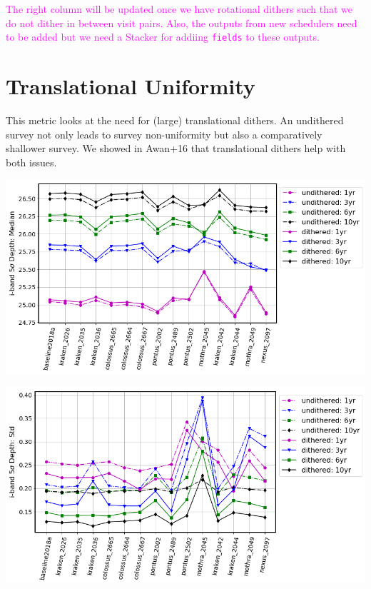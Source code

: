 \documentclass[a4paper,10pt]{article}
\newcommand{\ttt}[1]{\texttt{#1}}
\newcommand{\cl}[1]{\textcolor{magenta}{#1}}
\begin{document}
\cl{The right column will be updated once we have rotational dithers such that we do not dither in between visit pairs. Also, the outputs from new schedulers need to be added but we need a Stacker for addiing \ttt{fields} to these outputs.}

\newpage
\section*{Translational Uniformity\label{translational dithers}}
This metric looks at the need for (large) translational dithers. An undithered survey not only leads to survey non-uniformity but also a comparatively shallower survey. We showed in Awan+16 that translational dithers help with both issues.

\begin{minipage}{\columnwidth}
\vspace*{2em}
\centering
\includegraphics[width=.75\columnwidth]{lss_compare_depth_median_15dbs_undith.png}
\vspace*{2em}
\end{minipage}

\begin{minipage}{\columnwidth}
\vspace*{2em}
\centering
\includegraphics[width=.75\columnwidth]{lss_compare_depth_std_15dbs_undith.png}
\vspace*{2em}
\end{minipage}
\end{document}
